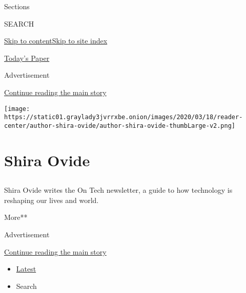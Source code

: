 Sections

SEARCH

\protect\hyperlink{site-content}{Skip to
content}\protect\hyperlink{site-index}{Skip to site index}

\href{https://myaccount.nytimes3xbfgragh.onion/auth/login?response_type=cookie\&client_id=vi}{}

\href{https://www.nytimes3xbfgragh.onion/section/todayspaper}{Today's
Paper}

Advertisement

\protect\hyperlink{after-top}{Continue reading the main story}

\texttt{[image: https://static01.graylady3jvrrxbe.onion/images/2020/03/18/reader-center/author-shira-ovide/author-shira-ovide-thumbLarge-v2.png]}

\hypertarget{shira-ovide}{%
\section{Shira Ovide}\label{shira-ovide}}

\hypertarget{section}{%
\subsection{}\label{section}}

Shira Ovide writes the On Tech newsletter, a guide to how technology is
reshaping our lives and world.

More**

Advertisement

\protect\hyperlink{after-mid1}{Continue reading the main story}

\begin{itemize}
\tightlist
\item
  \protect\hyperlink{stream-panel}{Latest}
\item
  Search
\end{itemize}

